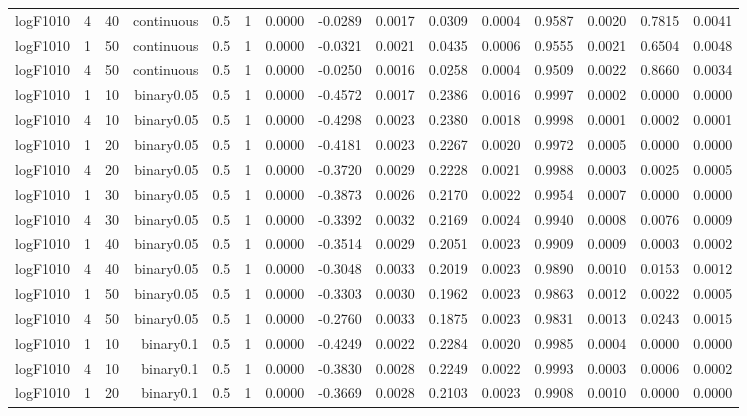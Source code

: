 \begin{longtable}{rrrrrrrrrrrrrrr}
  logF1010 & 4 & 40 & continuous & 0.5 & 1 & 0.0000 & -0.0289 & 0.0017 & 0.0309 & 0.0004 & 0.9587 & 0.0020 & 0.7815 & 0.0041 \\ 
  logF1010 & 1 & 50 & continuous & 0.5 & 1 & 0.0000 & -0.0321 & 0.0021 & 0.0435 & 0.0006 & 0.9555 & 0.0021 & 0.6504 & 0.0048 \\ 
  logF1010 & 4 & 50 & continuous & 0.5 & 1 & 0.0000 & -0.0250 & 0.0016 & 0.0258 & 0.0004 & 0.9509 & 0.0022 & 0.8660 & 0.0034 \\ 
  logF1010 & 1 & 10 & binary0.05 & 0.5 & 1 & 0.0000 & -0.4572 & 0.0017 & 0.2386 & 0.0016 & 0.9997 & 0.0002 & 0.0000 & 0.0000 \\ 
  logF1010 & 4 & 10 & binary0.05 & 0.5 & 1 & 0.0000 & -0.4298 & 0.0023 & 0.2380 & 0.0018 & 0.9998 & 0.0001 & 0.0002 & 0.0001 \\ 
  logF1010 & 1 & 20 & binary0.05 & 0.5 & 1 & 0.0000 & -0.4181 & 0.0023 & 0.2267 & 0.0020 & 0.9972 & 0.0005 & 0.0000 & 0.0000 \\ 
  logF1010 & 4 & 20 & binary0.05 & 0.5 & 1 & 0.0000 & -0.3720 & 0.0029 & 0.2228 & 0.0021 & 0.9988 & 0.0003 & 0.0025 & 0.0005 \\ 
  logF1010 & 1 & 30 & binary0.05 & 0.5 & 1 & 0.0000 & -0.3873 & 0.0026 & 0.2170 & 0.0022 & 0.9954 & 0.0007 & 0.0000 & 0.0000 \\ 
  logF1010 & 4 & 30 & binary0.05 & 0.5 & 1 & 0.0000 & -0.3392 & 0.0032 & 0.2169 & 0.0024 & 0.9940 & 0.0008 & 0.0076 & 0.0009 \\ 
  logF1010 & 1 & 40 & binary0.05 & 0.5 & 1 & 0.0000 & -0.3514 & 0.0029 & 0.2051 & 0.0023 & 0.9909 & 0.0009 & 0.0003 & 0.0002 \\ 
  logF1010 & 4 & 40 & binary0.05 & 0.5 & 1 & 0.0000 & -0.3048 & 0.0033 & 0.2019 & 0.0023 & 0.9890 & 0.0010 & 0.0153 & 0.0012 \\ 
  logF1010 & 1 & 50 & binary0.05 & 0.5 & 1 & 0.0000 & -0.3303 & 0.0030 & 0.1962 & 0.0023 & 0.9863 & 0.0012 & 0.0022 & 0.0005 \\ 
  logF1010 & 4 & 50 & binary0.05 & 0.5 & 1 & 0.0000 & -0.2760 & 0.0033 & 0.1875 & 0.0023 & 0.9831 & 0.0013 & 0.0243 & 0.0015 \\ 
  logF1010 & 1 & 10 & binary0.1 & 0.5 & 1 & 0.0000 & -0.4249 & 0.0022 & 0.2284 & 0.0020 & 0.9985 & 0.0004 & 0.0000 & 0.0000 \\ 
  logF1010 & 4 & 10 & binary0.1 & 0.5 & 1 & 0.0000 & -0.3830 & 0.0028 & 0.2249 & 0.0022 & 0.9993 & 0.0003 & 0.0006 & 0.0002 \\ 
  logF1010 & 1 & 20 & binary0.1 & 0.5 & 1 & 0.0000 & -0.3669 & 0.0028 & 0.2103 & 0.0023 & 0.9908 & 0.0010 & 0.0000 & 0.0000 \\ 

\end{longtable}
